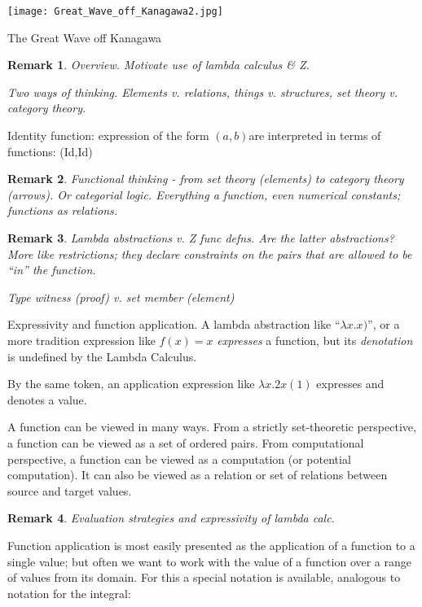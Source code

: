 \documentclass[12pt]{tufte-handout}
\numberwithin{equation}{subsection}
\numberwithin{equation}{subsection}
\newtheorem{remark}{Remark}
\newcommand\ab{\((a,b)\)}
\begin{document}
  \begin{marginfigure}%
    \centering
    \texttt{[image: Great\_Wave\_off\_Kanagawa2.jpg]}
    \caption{The Great Wave off Kanagawa}
  \end{marginfigure}

  \begin{remark}
    Overview.  Motivate use of lambda calculus \& Z.

    Two ways of thinking.  Elements v. relations, things v. structures,
    set theory v. category theory.
  \end{remark}

  Identity function: expression of the form \ab are interpreted in terms
  of functions: (Id,Id)

  \begin{remark}
    Functional thinking - from set theory (elements) to category theory
    (arrows).  Or categorial logic.  Everything a function, even
    numerical constants; functions as relations.
  \end{remark}

  \begin{remark}
    Lambda abstractions v. Z func defns.  Are the latter abstractions?
    More like restrictions; they declare constraints on the pairs that
    are allowed to be ``in'' the function.

    Type witness (proof) v. set member (element)
  \end{remark}

  Expressivity and function application.  A lambda abstraction like
  ``\(\lambda x.x)\)'', or a more tradition expression like \(f(x) = x\)
  \textit{expresses} a function, but its \textit{denotation} is
  undefined by the Lambda Calculus.

  By the same token, an application expression like \(\lambda x.2x(1)\)
  expresses and denotes a value.

  A function can be viewed in many ways.  From a strictly set-theoretic
  perspective, a function can be viewed as a set of ordered pairs.  From
  computational perspective, a function can be viewed as a computation
  (or potential computation).  It can also be viewed as a relation or
  set of relations between source and target values.

  \begin{remark}
    Evaluation strategies and expressivity of lambda calc.
  \end{remark}

  Function application is most easily presented as the application of a
  function to a single value; but often we want to work with the value
  of a function over a range of values from its domain.  For this a
  special notation is available, analogous to notation for the integral:
\end{document}
